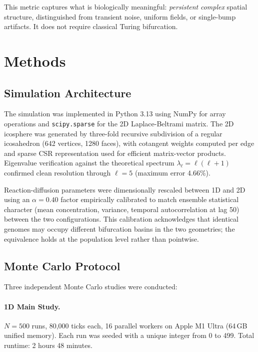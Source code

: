 \documentclass[11pt,letterpaper]{article}
\begin{document}
This metric captures what is biologically meaningful: \emph{persistent} \emph{complex} spatial structure, distinguished from transient noise, uniform fields, or single-bump artifacts. It does not require classical Turing bifurcation.

\section{Methods}

\subsection{Simulation Architecture}

The simulation was implemented in Python 3.13 using NumPy for array operations and \texttt{scipy.sparse} for the 2D Laplace-Beltrami matrix. The 2D icosphere was generated by three-fold recursive subdivision of a regular icosahedron (642 vertices, 1280 faces), with cotangent weights computed per edge and sparse CSR representation used for efficient matrix-vector products. Eigenvalue verification against the theoretical spectrum $\lambda_\ell = \ell(\ell+1)$ confirmed clean resolution through $\ell = 5$ (maximum error 4.66\%).

Reaction-diffusion parameters were dimensionally rescaled between 1D and 2D using an $\alpha = 0.40$ factor empirically calibrated to match ensemble statistical character (mean concentration, variance, temporal autocorrelation at lag 50) between the two configurations. This calibration acknowledges that identical genomes may occupy different bifurcation basins in the two geometries; the equivalence holds at the population level rather than pointwise.

\subsection{Monte Carlo Protocol}

Three independent Monte Carlo studies were conducted:

\paragraph{1D Main Study.} $N = 500$ runs, 80{,}000 ticks each, 16 parallel workers on Apple M1 Ultra (64\,GB unified memory). Each run was seeded with a unique integer from 0 to 499. Total runtime: 2 hours 48 minutes.
\end{document}
